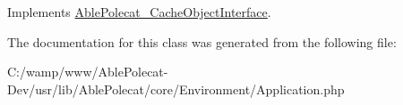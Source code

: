 Implements \hyperlink{interface_able_polecat___cache_object_interface_a3f2135f6ad45f51d075657f6d20db2cd}{Able\+Polecat\+\_\+\+Cache\+Object\+Interface}.



The documentation for this class was generated from the following file\+:\begin{DoxyCompactItemize}
\item 
C\+:/wamp/www/\+Able\+Polecat-\/\+Dev/usr/lib/\+Able\+Polecat/core/\+Environment/Application.\+php\end{DoxyCompactItemize}

